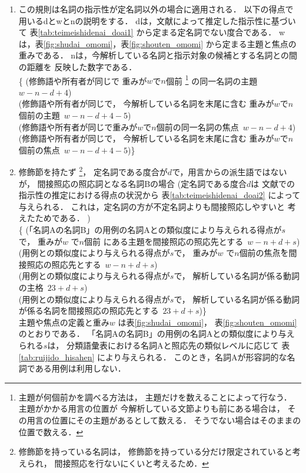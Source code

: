 {\begin{enumerate}
\item 
  \label{enum:定名詞以外探索}
  この規則は名詞の指示性が定名詞以外の場合に適用される．
  以下の得点で用いるdとwとnの説明をする．
  dは，文献\cite{match}によって推定した指示性に基づいて
  表\ref{tab:teimeishidenai_doai1} から定まる定名詞でない度合である．
  wは，表\ref{fig:shudai_omomi}，表\ref{fig:shouten_omomi}
  から定まる主題と焦点の重みである．
  nは，今解析している名詞と指示対象の候補とする名詞との間の距離を
  反映した数字である．\\
  \{
  (修飾語や所有者が同じで
  重みが$w$で$n$個前
  \footnote{
    主題が何個前かを調べる方法は，
    主題だけを数えることによって行なう．
    主題がかかる用言の位置が
    今解析している文節よりも前にある場合は，
    その用言の位置にその主題があるとして数える．
    そうでない場合はそのままの位置で数える．} 
  の同一名詞の主題 \,$w-n-d+4$)\\ 
  (修飾語や所有者が同じで，
  今解析している名詞を末尾に含む
  重みが$w$で$n$個前の主題 \,$w-n-d+4-5$)\\ 
  (修飾語や所有者が同じで重みが$w$で$n$個前の同一名詞の焦点 \,$w-n-d+4$)\\ 
  (修飾語や所有者が同じで，
  今解析している名詞を末尾に含む
  重みが$w$で$n$個前の焦点 \,$w-n-d+4-5$)\}

\item 
  \label{enum:間接照応_非サ変名詞}
  修飾節を持たず
  \footnote{
    修飾節を持っている名詞は，
    修飾節を持っている分だけ限定されていると考えられ，
    間接照応を行ないにくいと考えるため．
    }，
  定名詞である度合が$d$で，用言からの派生語ではないが，
  間接照応の照応詞となる名詞Bの場合
  (定名詞である度合$d$は
  文献\cite{match}での指示性の推定における得点の状況から
  表\ref{tab:teimeishidenai_doai2} によって与えられる．
  これは，定名詞の方が不定名詞よりも間接照応しやすいと
  考えたためである．  )\\
  \{
  (「名詞Aの名詞B」の用例の名詞Aとの類似度により与えられる得点が$s$で，
  重みが$w$ で$n$個前
  にある主題を間接照応の照応先とする \,$w-n+d+s$)\\ 
  (用例との類似度により与えられる得点が$s$で，
  重みが$w$ で$n$個前の\.焦\.点を間接照応の照応先とする \,$w-n+d+s$)\\ 
  (用例との類似度により与えられる得点が$s$で，
  解析している名詞が係る動詞の主格 \,$23+d+s$)\\ 
  (用例との類似度により与えられる得点が$s$で，
  解析している名詞が係る動詞が係る名詞を間接照応の照応先とする \,$23+d+s$)\}\\ 
  主題や焦点の定義と重み$w$ は表\ref{fig:shudai_omomi}，
  表\ref{fig:shouten_omomi} のとおりである．
  「名詞Aの名詞B」の用例の名詞Aとの類似度により与えられる$s$は，
  分類語彙表における名詞Aと照応先の類似レベルに応じて
  表\ref{tab:ruijido_hisahen} により与えられる．
  このとき，名詞Aが形容詞的な名詞である用例は利用しない．


\end{enumerate}}
